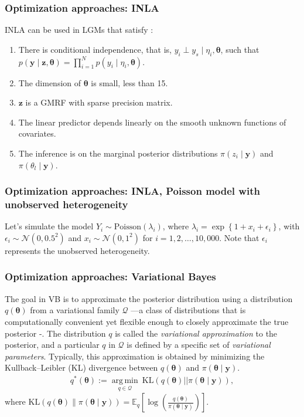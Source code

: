 \documentclass[12pt, compress]{beamer}
\DeclareMathOperator*{\argmin}{arg\,min}
\begin{document}
\begin{frame}
	\frametitle{Optimization approaches: INLA}
INLA can be used in LGMs that satisfy \citep{rue2017bayesian,martino2019integrated}:
\begin{enumerate}
	\item There is conditional independence, that is, $y_i\perp y_s \mid \eta_i,\boldsymbol{\theta}$, such that $p(\boldsymbol{y}\mid \boldsymbol{z},\boldsymbol{\theta})=\prod_{i=1}^{N}p(y_i\mid \eta_i,\boldsymbol{\theta})$.
	\item The dimension of $\boldsymbol{\theta}$ is small, less than 15.
	\item $\boldsymbol{z}$ is a GMRF with sparse precision matrix.
	\item The linear predictor depends linearly on the smooth unknown functions of covariates.
	\item The inference is on the marginal posterior distributions $\pi(z_i\mid \boldsymbol{y})$ and $\pi(\theta_l\mid \boldsymbol{y})$.  
\end{enumerate} 
\end{frame}

\begin{frame}
	\frametitle{Optimization approaches: INLA, Poisson model with unobserved heterogeneity}
Let's simulate the model $Y_i \sim \text{Poisson}(\lambda_i)$, where $\lambda_i = \exp\left\{1 + x_i + \epsilon_i\right\}$, with $\epsilon_i \sim \mathcal{N}(0, 0.5^2)$ and $x_i \sim \mathcal{N}(0, 1^2)$ for $i = 1, 2, \dots, 10,\!000$. Note that $\epsilon_i$ represents the unobserved heterogeneity.
\end{frame}

\begin{frame}
	\frametitle{Optimization approaches: Variational Bayes}
The goal in VB is to approximate the posterior distribution using a distribution $q(\boldsymbol{\theta})$ from a variational family $\mathcal{Q}$ —a class of distributions that is computationally convenient yet flexible enough to closely approximate the true posterior \cite{blei2017variational}-. The distribution $q$ is called the \textit{variational approximation} to the posterior, and a particular $q$ in $\mathcal{Q}$ is defined by a specific set of \textit{variational parameters}. Typically, this approximation is obtained by minimizing the Kullback–Leibler (KL) divergence between $q(\boldsymbol{\theta})$ and $\pi(\boldsymbol{\theta} \mid \mathbf{y})$.
\begin{align}\label{eq:VB1}
	q^*(\boldsymbol{\theta}):=\underset{q \in \mathcal{Q}}{\argmin} \  \text{KL}(q(\boldsymbol{\theta})||\pi(\boldsymbol{\theta} \mid \mathbf{y})),
\end{align}  
where $\text{KL}(q(\boldsymbol{\theta}) \| \pi(\boldsymbol{\theta} \mid \mathbf{y})) = \mathbb{E}_q\left[\log\left(\frac{q(\boldsymbol{\theta})}{\pi(\boldsymbol{\theta} \mid \mathbf{y})}\right)\right]$.
\end{frame}
\end{document}
